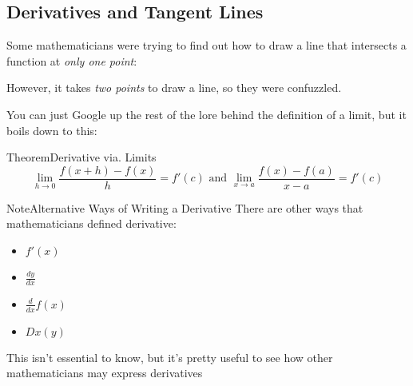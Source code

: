 \documentclass{MathNotes}
\newenvironment{note}[1]{\begin{YellowBox}{Note}{#1}}{\end{YellowBox}}
\newenvironment{theorem}[1]{\begin{GrayBox}{Theorem}{#1}}{\end{GrayBox}}
\begin{document}
\subsection{Derivatives and Tangent Lines}
\begin{multicols}{2}
	Some mathematicians were trying to find out how to draw a line that intersects
	a function at \textit{only one point}:
	\begin{center}
	\end{center}
\end{multicols}

However, it takes \textit{two points} to draw a line, so they were confuzzled.

You can just Google up the rest of the lore behind the definition of a limit,
but it boils down to this:
\begin{theorem}{Derivative via. Limits}
	\begin{displaymath}
		\lim_{h\to 0}\frac{f(x+h)-f(x)}{h}=f'(c)\text{ and }
		\lim_{x\to a}\frac{f(x)-f(a)}{x-a}=f'(c)
	\end{displaymath}
\end{theorem}

\begin{note}{Alternative Ways of Writing a Derivative}
	There are other ways that mathematicians defined derivative:
	\begin{multicols}{2}[]
		\begin{itemize}
			\item $f'(x)$
			\item $\frac{dy}{dx}$
			\item $\frac{d}{dx}f(x)$
			\item $Dx(y)$
		\end{itemize}
	\end{multicols}
	This isn't essential to know, but it's pretty useful to see how other
	mathematicians may express derivatives
\end{note}
\end{document}
